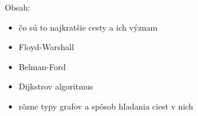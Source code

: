 




Obsah:
\begin{itemize}
    \item čo sú to najkratšie cesty a ich význam
    \item Floyd-Warshall
    \item Belman-Ford
    \item Dijkstrov algoritmus
    \item rôzne typy grafov a spôsob hľadania ciest v nich
\end{itemize}


